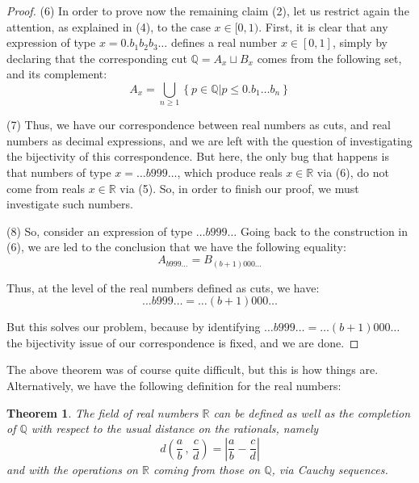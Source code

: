 \documentclass[12pt]{amsbook}
\newtheorem{theorem}{Theorem}[chapter]
\begin{document}
\begin{proof}
\medskip

(6) In order to prove now the remaining claim (2), let us restrict again the attention, as explained in (4), to the  case $x\in[0,1)$. First, it is clear that any expression of type $x=0.b_1b_2b_3\ldots$ defines a real number $x\in[0,1]$, simply by declaring that the corresponding cut $\mathbb Q=A_x\sqcup B_x$ comes from the following set, and its complement:
$$A_x=\bigcup_{n\geq1}\left\{p\in\mathbb Q\Big|p\leq 0.b_1\ldots b_n\right\}$$

(7) Thus, we have our correspondence between real numbers as cuts, and real numbers as decimal expressions, and we are left with the question of investigating the bijectivity of this correspondence. But here, the only bug that happens is that numbers of type $x=\ldots b999\ldots$, which produce reals $x\in\mathbb R$ via (6), do not come from reals $x\in\mathbb R$ via (5). So, in order to finish our proof, we must investigate such numbers.

\medskip

(8) So, consider an expression of type $\ldots b999\ldots$ Going back to the construction in (6), we are led to the conclusion that we have the following equality:
$$A_{b999\ldots}=B_{(b+1)000\ldots}$$

Thus, at the level of the real numbers defined as cuts, we have:
$$\ldots b999\ldots=\ldots(b+1)000\ldots$$

But this solves our problem, because by identifying $\ldots b999\ldots=\ldots(b+1)000\ldots$ the bijectivity issue of our correspondence is fixed, and we are done.
\end{proof}

The above theorem was of course quite difficult, but this is how things are. Alternatively, we have the following definition for the real numbers:

\begin{theorem}
The field of real numbers $\mathbb R$ can be defined as well as the completion of $\mathbb Q$ with respect to the usual distance on the rationals, namely
$$d\left(\frac{a}{b}\,,\,\frac{c}{d}\right)=\left|\frac{a}{b}-\frac{c}{d}\right|$$
and with the operations on $\mathbb R$ coming from those on $\mathbb Q$, via Cauchy sequences.
\end{theorem} 
\end{document}
